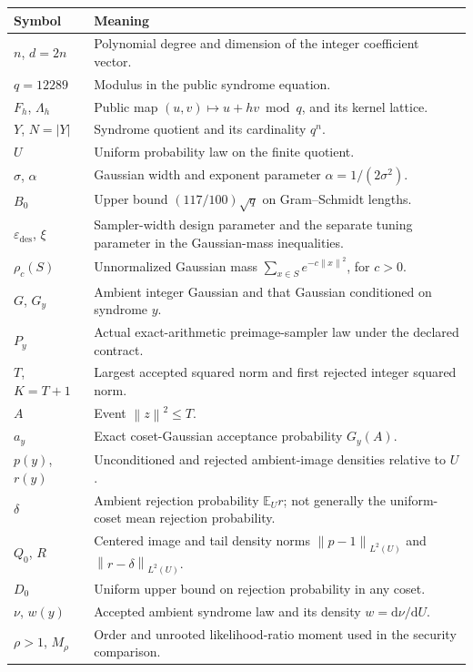 \documentclass[11pt,a4paper]{article}
\newcommand{\E}{\mathbb E}
\newcommand{\eps}{\varepsilon}
\newcommand{\norm}[1]{\left\lVert#1\right\rVert}
\theoremstyle{definition}
\theoremstyle{remark}
\numberwithin{equation}{section}
\begin{document}
\begin{longtable}{@{}p{}p{}@{}}
\toprule
Symbol & Meaning \\
\midrule
\endhead
$n$, $d=2n$ & Polynomial degree and dimension of the integer coefficient vector. \\
$q=12289$ & Modulus in the public syndrome equation. \\
$F_h$, $\Lambda_h$ & Public map $(u,v)\mapsto u+hv\bmod q$, and its kernel lattice. \\
$Y$, $N=|Y|$ & Syndrome quotient and its cardinality $q^n$. \\
$U$ & Uniform probability law on the finite quotient. \\
$\sigma$, $\alpha$ & Gaussian width and exponent parameter $\alpha=1/(2\sigma^2)$. \\
$B_0$ & Upper bound $(117/100)\sqrt q$ on Gram--Schmidt lengths. \\
$\eps_{\mathrm{des}}$, $\xi$ & Sampler-width design parameter and the separate tuning parameter in the Gaussian-mass inequalities. \\
$\rho_c(S)$ & Unnormalized Gaussian mass $\sum_{x\in S}e^{-c\norm{x}^2}$, for $c>0$. \\
$G$, $G_y$ & Ambient integer Gaussian and that Gaussian conditioned on syndrome $y$. \\
$P_y$ & Actual exact-arithmetic preimage-sampler law under the declared contract. \\
$T$, $K=T+1$ & Largest accepted squared norm and first rejected integer squared norm. \\
$A$ & Event $\norm{z}^2\le T$. \\
$a_y$ & Exact coset-Gaussian acceptance probability $G_y(A)$. \\
$p(y)$, $r(y)$ & Unconditioned and rejected ambient-image densities relative to $U$. \\
$\delta$ & Ambient rejection probability $\E_U r$; not generally the uniform-coset mean rejection probability. \\
$Q_0$, $R$ & Centered image and tail density norms $\norm{p-1}_{L^2(U)}$ and $\norm{r-\delta}_{L^2(U)}$. \\
$D_0$ & Uniform upper bound on rejection probability in any coset. \\
$\nu$, $w(y)$ & Accepted ambient syndrome law and its density $w=\mathrm d\nu/\mathrm dU$. \\
$\rho>1$, $M_\rho$ & Order and unrooted likelihood-ratio moment used in the security comparison. \\

\end{longtable}
\end{document}
